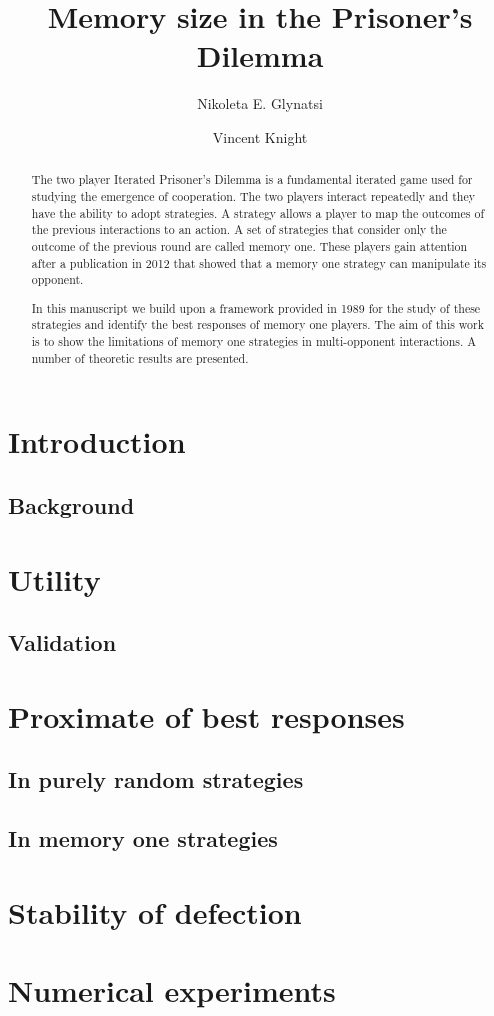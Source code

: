 \documentclass[10pt]{article}
\title{Memory size in the Prisoner's Dilemma}
\author{Nikoleta E. Glynatsi \and Vincent Knight}
\date{}
\begin{document}
\maketitle

\begin{abstract}

The two player Iterated Prisoner's Dilemma is a fundamental iterated game used
for studying the emergence of cooperation. The two players interact repeatedly
and they have the ability to adopt strategies. A strategy allows a player to map
the outcomes of the previous interactions to an action. A set of strategies that
consider only the outcome of the previous round are called memory one. These
players gain attention after a publication in 2012 that showed that a memory one
strategy can manipulate its opponent.

In this manuscript we build upon a framework provided in 1989 for the study of
these strategies and identify the best responses of memory one players. The aim
of this work is to show the limitations of memory one strategies in multi-opponent
interactions. A number of theoretic results are presented.
\end{abstract}

\section{Introduction}

\subsection{Background}

\section{Utility}

\subsection{Validation}

\section{Proximate of best responses}
\subsection{In purely random strategies}
\subsection{In memory one strategies}

\section{Stability of defection}

\section{Numerical experiments}



\end{document}
